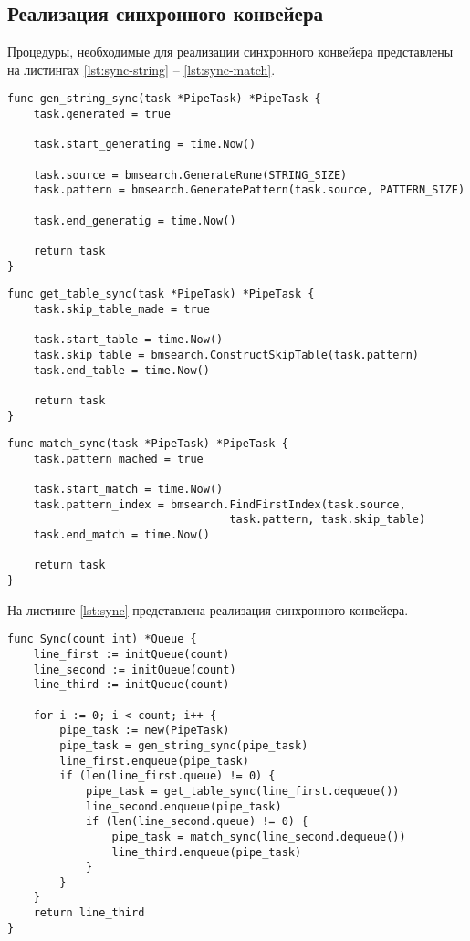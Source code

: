 \subsection{Реализация синхронного конвейера}
Процедуры, необходимые для реализации синхронного конвейера представлены на листингах \ref{lst:sync-string} --  \ref{lst:sync-match}.
\begin{lstlisting}[label=lst:sync-string,caption=Получение подстрок]
func gen_string_sync(task *PipeTask) *PipeTask {
	task.generated = true
	
	task.start_generating = time.Now()
	
	task.source = bmsearch.GenerateRune(STRING_SIZE)
	task.pattern = bmsearch.GeneratePattern(task.source, PATTERN_SIZE)
	
	task.end_generatig = time.Now()
	
	return task
}
\end{lstlisting}
\begin{lstlisting}[label=lst:sync-table,caption=Получение словаря]
func get_table_sync(task *PipeTask) *PipeTask {
	task.skip_table_made = true
	
	task.start_table = time.Now()
	task.skip_table = bmsearch.ConstructSkipTable(task.pattern)
	task.end_table = time.Now()
	
	return task
}
\end{lstlisting}

\begin{lstlisting}[label=lst:sync-match,caption=Поиск подстроки]
func match_sync(task *PipeTask) *PipeTask {
	task.pattern_mached = true
	
	task.start_match = time.Now()
	task.pattern_index = bmsearch.FindFirstIndex(task.source, 
								  task.pattern, task.skip_table)
	task.end_match = time.Now()
	
	return task
}
\end{lstlisting}
На листинге \ref{lst:sync} представлена реализация синхронного конвейера.
\begin{lstlisting}[label=lst:sync,caption=Синхронный конвейер]
func Sync(count int) *Queue {
	line_first := initQueue(count)
	line_second := initQueue(count)
	line_third := initQueue(count)
	
	for i := 0; i < count; i++ {
		pipe_task := new(PipeTask)
		pipe_task = gen_string_sync(pipe_task)
		line_first.enqueue(pipe_task)
		if (len(line_first.queue) != 0) {
			pipe_task = get_table_sync(line_first.dequeue())
			line_second.enqueue(pipe_task)
			if (len(line_second.queue) != 0) {
				pipe_task = match_sync(line_second.dequeue())
				line_third.enqueue(pipe_task)
			}
		}
	}
	return line_third
}
\end{lstlisting}

